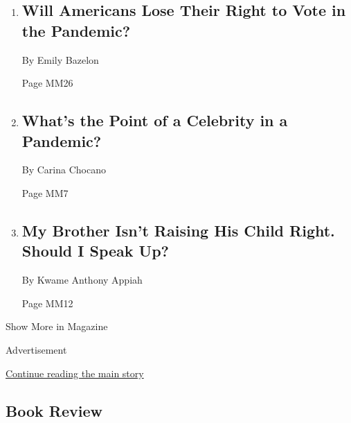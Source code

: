 \begin{enumerate}
\def\labelenumi{\arabic{enumi}.}
\item
  \href{/2020/05/05/magazine/voting-by-mail-2020-covid.html}{}

  \hypertarget{will-americans-lose-their-right-to-vote-in-the-pandemic-1}{%
  \subsection{Will Americans Lose Their Right to Vote in the
  Pandemic?}\label{will-americans-lose-their-right-to-vote-in-the-pandemic-1}}

  By Emily Bazelon

  Page MM26
\item
  \href{/2020/05/06/magazine/whats-the-point-of-a-celebrity-in-a-pandemic.html}{}

  \hypertarget{whats-the-point-of-a-celebrity-in-a-pandemic}{%
  \subsection{What's the Point of a Celebrity in a
  Pandemic?}\label{whats-the-point-of-a-celebrity-in-a-pandemic}}

  By Carina Chocano

  Page MM7
\item
  \href{/2020/05/05/magazine/my-brother-isnt-raising-his-child-right-should-i-speak-up-coronavirus.html}{}

  \hypertarget{my-brother-isnt-raising-his-child-right-should-i-speak-up}{%
  \subsection{My Brother Isn't Raising His Child Right. Should I Speak
  Up?}\label{my-brother-isnt-raising-his-child-right-should-i-speak-up}}

  By Kwame Anthony Appiah

  Page MM12
\end{enumerate}

Show More in Magazine

Advertisement

\protect\hyperlink{after-mid6}{Continue reading the main story}

\hypertarget{book-review}{%
\subsection{Book Review}\label{book-review}}


